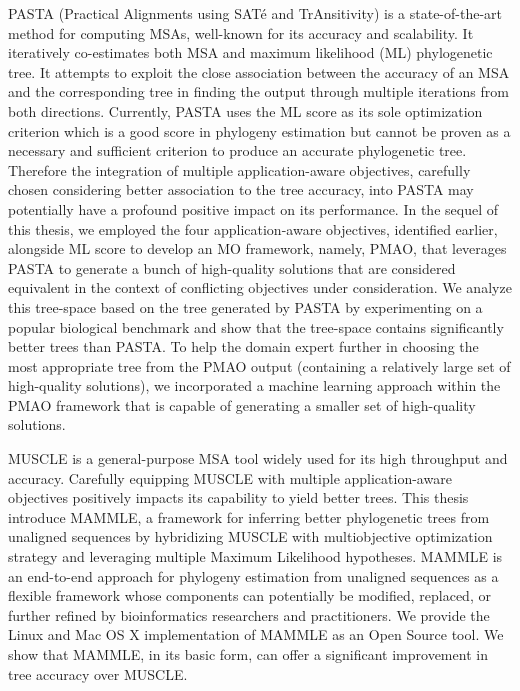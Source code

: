 PASTA (Practical Alignments using SAT\'e and TrAnsitivity) is a state-of-the-art method for computing MSAs, well-known for its accuracy and scalability. It iteratively co-estimates both MSA and maximum likelihood (ML) phylogenetic tree. It attempts to exploit the close association between the accuracy of an MSA and the corresponding tree in finding the output through multiple iterations from both directions. Currently, PASTA uses the ML score as its sole optimization criterion which is a good score in phylogeny estimation but cannot be proven as a necessary and sufficient criterion to produce an accurate phylogenetic tree. Therefore the integration of multiple application-aware objectives, carefully chosen considering better association to the tree accuracy, into PASTA may potentially have a profound positive impact on its performance. In the sequel of this thesis, we employed the four application-aware objectives, identified earlier, alongside ML score to develop an MO framework, namely, PMAO, that leverages PASTA to generate a bunch of high-quality solutions that are considered equivalent in the context of conflicting objectives under consideration. We analyze this tree-space based on the tree generated by PASTA by experimenting on a popular biological benchmark and show that the tree-space contains significantly better trees than PASTA. To help the domain expert further in choosing the most appropriate tree from the PMAO output (containing a relatively large set of high-quality solutions), we incorporated a machine learning approach within the PMAO framework that is capable of generating a smaller set of high-quality solutions. %

MUSCLE is a general-purpose MSA tool widely used for its high throughput and accuracy. Carefully equipping MUSCLE with multiple application-aware objectives positively impacts its capability to yield better trees. This thesis introduce MAMMLE, a framework for inferring better phylogenetic trees from unaligned sequences by hybridizing MUSCLE with multiobjective optimization strategy and leveraging multiple Maximum Likelihood hypotheses. MAMMLE is an end-to-end approach for phylogeny estimation from unaligned sequences as a flexible framework whose components can potentially be modified, replaced, or further refined by bioinformatics researchers and practitioners. We provide the Linux and Mac OS X implementation of MAMMLE as an Open Source tool. We show that MAMMLE, in its basic form, can offer a significant improvement in tree accuracy over MUSCLE.

